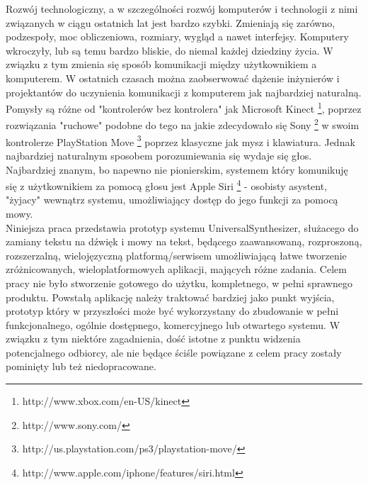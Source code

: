 


\begin{abstracts}        %

Rozwój technologiczny, a w szczególności rozwój komputerów i technologii z nimi związanych w ciągu ostatnich lat jest bardzo szybki. Zmieniają się zarówno, podzespoły, moc obliczeniowa, rozmiary, wygląd a nawet interfejsy. Komputery wkroczyły, lub są temu bardzo bliskie, do niemal każdej dziedziny życia. W związku z tym zmienia się sposób komunikacji między użytkownikiem a komputerem. W ostatnich czasach można zaobserwować dążenie inżynierów i projektantów do uczynienia komunikacji z komputerem jak najbardziej naturalną. Pomysły są różne od "kontrolerów bez kontrolera" jak Microsoft Kinect \footnote {http://www.xbox.com/en-US/kinect}, poprzez rozwiązania "ruchowe" podobne do tego na jakie zdecydowało się Sony \footnote{http://www.sony.com/} w swoim kontrolerze PlayStation Move \footnote{http://us.playstation.com/ps3/playstation-move/} poprzez klasyczne  jak mysz i klawiatura. Jednak najbardziej naturalnym sposobem porozumiewania się wydaje się głos. Najbardziej znanym, bo napewno nie pionierskim, systemem który komunikuję się z użytkownikiem za pomocą głosu jest Apple Siri \footnote{http://www.apple.com/iphone/features/siri.html} - osobisty asystent, "żyjacy" wewnątrz systemu, umożliwiający dostęp do jego funkcji za pomocą mowy.\\
Niniejsza praca przedstawia prototyp systemu UniversalSynthesizer, służacego do zamiany tekstu na dźwięk i mowy na tekst, będącego zaawansowaną, rozproszoną, rozszerzalną, wielojęzyczną platformą/serwisem umożliwiającą łatwe tworzenie zróżnicowanych, wieloplatformowych aplikacji, mających różne zadania. Celem pracy nie było stworzenie gotowego do użytku, kompletnego, w pełni sprawnego produktu. Powstałą aplikację należy traktować bardziej jako punkt wyjścia, prototyp który w przyszłości może być wykorzystany do zbudowanie w pełni funkcjonalnego, ogólnie dostępnego, komercyjnego lub otwartego systemu. W związku z tym niektóre zagadnienia, dość istotne z punktu widzenia potencjalnego odbiorcy, ale nie będące ściśle powiązane z celem pracy zostały pominięty lub też niedopracowane. 
\end{abstracts}


